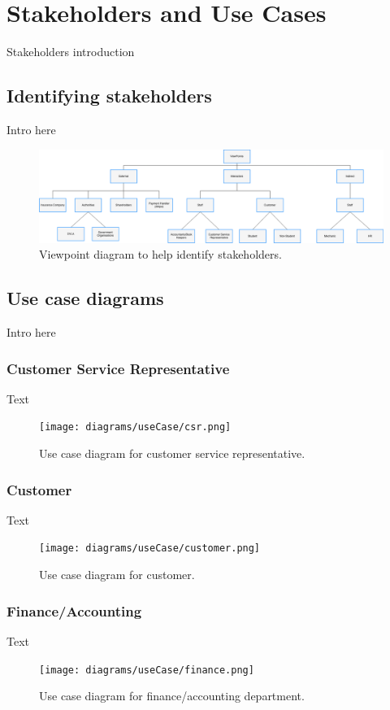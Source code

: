 \section{Stakeholders and Use Cases}
  Stakeholders introduction

  \subsection{Identifying stakeholders}
    Intro here
    \begin{figure}[H]
      \centering
      \includegraphics[width=12cm]{diagrams/viewpoints.drawio.png}
      \caption{Viewpoint diagram to help identify stakeholders.}
      \label{fig:viewpoint}
    \end{figure}

  \subsection{Use case diagrams}
    Intro here

    \subsubsection{Customer Service Representative}
      Text
      \begin{figure}[H]
        \centering
        \texttt{[image: diagrams/useCase/csr.png]}
        \caption{Use case diagram for customer service representative.}
        \label{fig:UCcsr}
      \end{figure}

    \subsubsection{Customer}
      Text 
      \begin{figure}[H]
        \centering
        \texttt{[image: diagrams/useCase/customer.png]}
        \caption{Use case diagram for customer.}
        \label{fig:UCcustomer}
      \end{figure}
    
    \subsubsection{Finance/Accounting}
      Text
      \begin{figure}[H]
        \centering
        \texttt{[image: diagrams/useCase/finance.png]}
        \caption{Use case diagram for finance/accounting department.}
        \label{fig:UCaccounting}
      \end{figure}

